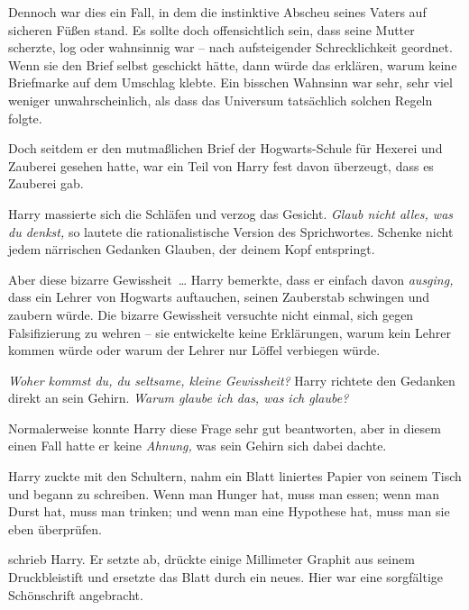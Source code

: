 Dennoch war dies ein Fall, in dem die instinktive Abscheu seines Vaters auf sicheren Füßen stand. Es sollte doch offensichtlich sein, dass seine Mutter scherzte, log oder wahnsinnig war – nach aufsteigender Schrecklichkeit geordnet. Wenn sie den Brief selbst geschickt hätte, dann würde das erklären, warum keine Briefmarke auf dem Umschlag klebte. Ein bisschen Wahnsinn war sehr, sehr viel weniger unwahrscheinlich, als dass das Universum tatsächlich solchen Regeln folgte.

Doch seitdem er den mutmaßlichen Brief der Hogwarts-Schule für Hexerei und Zauberei gesehen hatte, war ein Teil von Harry fest davon überzeugt, dass es Zauberei gab.

Harry massierte sich die Schläfen und verzog das Gesicht. \emph{Glaub nicht alles, was du denkst,} so lautete die rationalistische Version des Sprichwortes. Schenke nicht jedem närrischen Gedanken Glauben, der deinem Kopf entspringt.

Aber diese bizarre Gewissheit … Harry bemerkte, dass er einfach davon \emph{ausging,} dass ein Lehrer von Hogwarts auftauchen, seinen Zauberstab schwingen und zaubern würde. Die bizarre Gewissheit versuchte nicht einmal, sich gegen Falsifizierung zu wehren – sie entwickelte keine Erklärungen, warum kein Lehrer kommen würde oder warum der Lehrer nur Löffel verbiegen würde.

\emph{Woher kommst du, du seltsame, kleine Gewissheit?} Harry richtete den Gedanken direkt an sein Gehirn. \emph{Warum glaube ich das, was ich glaube?}

Normalerweise konnte Harry diese Frage sehr gut beantworten, aber in diesem einen Fall hatte er keine \emph{Ahnung,} was sein Gehirn sich dabei dachte.

Harry zuckte mit den Schultern, nahm ein Blatt liniertes Papier von seinem Tisch und begann zu schreiben. Wenn man Hunger hat, muss man essen; wenn man Durst hat, muss man trinken; und wenn man eine Hypothese hat, muss man sie eben überprüfen.

\begin{writtenNote}
\end{writtenNote}

\noindent schrieb Harry. Er setzte ab, drückte einige Millimeter Graphit aus seinem Druckbleistift und ersetzte das Blatt durch ein neues. Hier war eine sorgfältige Schönschrift angebracht.

